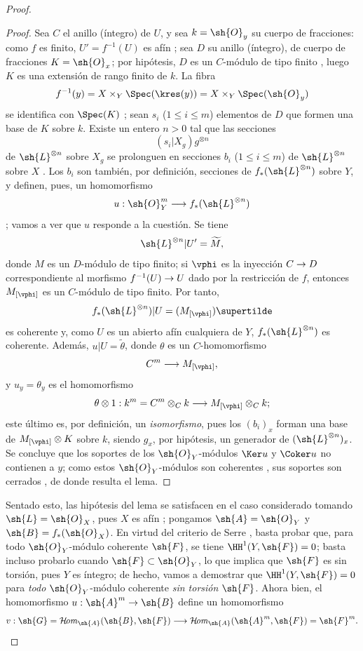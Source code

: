 \documentclass[oneside,10pt]{amsart}
\makeatletter
\renewcommand{\leq}{\leqslant}
\newcommand{\ega@arrow}[2]{\mathchoice{#1}{#2}{#2}{#2}}
\renewcommand{\to}{\ega@arrow{\longrightarrow}{\rightarrow}}
\def\shHom{\mathcal{H}\!\mathit{om}}
\makeatother
\begin{document}
\begin{proof}
\begin{proof}
Sea $C$ el anillo (íntegro) de $U$, y sea $k=\sh{O}_y$ su cuerpo de fracciones:
como $f$ es finito, $U'=f^{-1}(U)$ es afín ;
sea $D$ su anillo (íntegro), de cuerpo de fracciones $K=\sh{O}_x$;
por hipótesis, $D$ es un $C$-módulo de tipo finito , luego $K$ es una extensión de rango finito de $k$.
La fibra
\[
  f^{-1}(y)
  =X\times_Y\Spec(\kres(y))
  =X\times_Y\Spec(\sh{O}_y)
\]
se identifica con $\Spec(K)$ ;
sean $s_i$ ($1\leq i\leq m$) elementos de $D$ que formen una base de $K$ sobre $k$.
Existe un entero $n>0$ tal que las secciones
\[
  (s_i|X_g)g^{\otimes n}
\]
de $\sh{L}^{\otimes n}$ sobre $X_g$ se prolonguen en secciones $b_i$ ($1\leq i\leq m$) de $\sh{L}^{\otimes n}$ sobre $X$ .
Los $b_i$ son también, por definición, secciones de $f_*(\sh{L}^{\otimes n})$ sobre $Y$, y definen, pues, un homomorfismo
\[
  u:\sh{O}_Y^m\to f_*(\sh{L}^{\otimes n})
\]
;
vamos a ver que $u$ responde a la cuestión.
Se tiene
\[
  \sh{L}^{\otimes n}|U'=\widetilde{M},
\]
donde $M$ es un $D$-módulo de tipo finito;
si $\vphi$ es la inyección $C\to D$ correspondiente al morfismo $f^{-1}(U)\to U$ dado por la restricción de $f$, entonces $M_{[\vphi]}$ es un $C$-módulo de tipo finito.
Por tanto,
\[
  f_*(\sh{L}^{\otimes n})|U=(M_{[\vphi]})\supertilde
\]
 es coherente y, como $U$ es un abierto afín cualquiera de $Y$, $f_*(\sh{L}^{\otimes n})$ es coherente.
Además, $u|U=\widetilde{\theta}$, donde $\theta$ es un $C$-homomorfismo
\[
  C^m\to M_{[\vphi]},
\]
y $u_y=\theta_y$ es el homomorfismo
\[
  \theta\otimes1:
  k^m=C^m\otimes_Ck\to M_{[\vphi]}\otimes_Ck;
\]
este último es, por definición, un \emph{isomorfismo}, pues los $(b_i)_x$ forman una base de $M_{[\vphi]}\otimes K$ sobre $k$, siendo $g_x$, por hipótesis, un generador de $(\sh{L}^{\otimes n})_x$.
Se concluye que los soportes de los $\sh{O}_Y$-módulos $\Ker u$ y $\Coker u$ no contienen a $y$;
como estos $\sh{O}_Y$-módulos son coherentes , sus soportes son cerrados , de donde resulta el lema.
\end{proof}

Sentado esto, las hipótesis del lema  se satisfacen en el caso considerado tomando $\sh{L}=\sh{O}_X$, pues $X$ es afín ;
pongamos $\sh{A}=\sh{O}_Y$ y $\sh{B}=f_*(\sh{O}_X)$.
En virtud del criterio de Serre , basta probar que, para todo $\sh{O}_Y$-módulo coherente $\sh{F}$, se tiene $\HH^1(Y,\sh{F})=0$;
basta incluso probarlo cuando $\sh{F}\subset\sh{O}_Y$, lo que implica que $\sh{F}$ es sin torsión, pues $Y$ es íntegro;
de hecho, vamos a demostrar que $\HH^1(Y,\sh{F})=0$ para \emph{todo} $\sh{O}_Y$-módulo coherente \emph{sin torsión} $\sh{F}$.
Ahora bien, el homomorfismo $u:\sh{A}^m\to\sh{B}$ define un homomorfismo
\[
  v:\sh{G}=\shHom_{\sh{A}}(\sh{B},\sh{F})
  \to
  \shHom_{\sh{A}}(\sh{A}^m,\sh{F})
  =\sh{F}^m.
\]


\end{proof}
\end{document}
